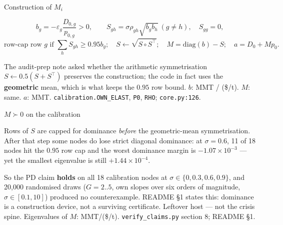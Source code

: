 \begin{frame}{Construction of $M_i$}

{\small
\[
b_g = -\varepsilon_g \frac{D_{0,g}}{p_{0,g}}>0,
\qquad
S_{gh}=\sigma\rho_{gh}\sqrt{b_g b_h}\ (g\neq h),\quad S_{gg}=0,
\]
\[
\text{row-cap row }g\text{ if }\textstyle\sum_h S_{gh}\ge 0.95 b_g;
\quad
S\leftarrow\sqrt{S\circ S^\top};
\quad
M=\mathrm{diag}(b)-S;
\quad
a=D_0+M p_0.
\]}

The audit-prep note asked whether the arithmetic symmetrisation
$S\leftarrow 0.5(S+S^\top)$ preserves the construction; the code in fact
uses the \textbf{geometric} mean, which is what keeps the $0.95$ row bound.
{$b$: MMT / (\$/t). $M$: same. $a$: MMT.}
{\texttt{calibration.OWN\_ELAST}, \texttt{P0}, \texttt{RHO}; \texttt{core.py:126}.}
\end{frame}

\begin{frame}{$M\succ 0$ on the calibration}

Rows of $S$ are capped for dominance \emph{before} the geometric-mean
symmetrisation. After that step some nodes do lose strict diagonal
dominance: at $\sigma=0.6$, 11 of 18 nodes hit the $0.95$ row cap and the
worst dominance margin is $-1.07\times 10^{-3}$ --- yet the smallest
eigenvalue is still $+1.44\times 10^{-4}$.

So the PD claim \textbf{holds} on all 18 calibration nodes at
$\sigma\in\{0,0.3,0.6,0.9\}$, and 20{,}000 randomised draws
($G=2..5$, own slopes over six orders of magnitude, $\sigma\in[0.1,10]$)
produced no counterexample. README \S1 states this: dominance is a
construction device, not a surviving certificate. Leftover host --- not
the crisis spine.
{Eigenvalues of $M$: MMT/(\$/t).}
{\texttt{verify\_claims.py} section 8; README \S1.}
\end{frame}

